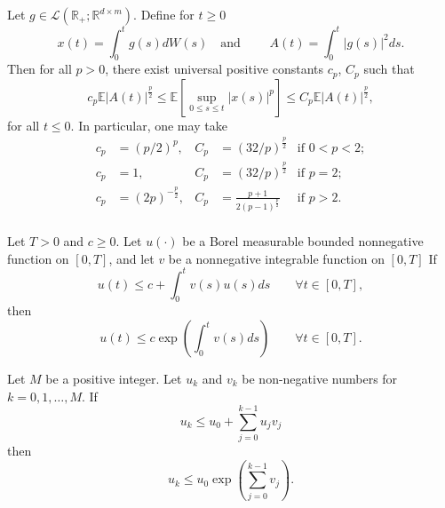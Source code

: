 \documentclass[3p]{elsarticle}
\theoremstyle{definition}
\theoremstyle{plain}%
\theoremstyle{remark}
\newcommand{\m}[1]{\mathbb{E}#1}
\begin{document}
\begin{appendices}
\begin{bdg}
	Let $g\in \mathcal{L}(\mathbb{R}_+; \mathbb{R}^{d\times m})$. Define for $t\geq 0$
	\begin{equation}
		\label{thm:BDG}
		x(t) = \int_{0}^{t} g(s)dW(s) \quad \text{and } \qquad 
		A(t) = \int_{0}^{t} |g(s)|^2 ds.
	\end{equation}
	Then for all $p>0$, there exist universal positive constants $c_p$, $C_p$ such that
	\begin{equation}
		c_p\m|{A(t)}|^{\frac{p}{2}}
		\leq
		\m \left[
		\sup_{0\leq s \leq t} |x(s)|^p
		\right]
		\leq 
		C_p \m |A(t)|^{\frac{p}{2}},
	\end{equation}
	for all $t\leq 0$.  In particular, one may take
	\begin{align*}
	c_p &= (p/2)^p, & 			 C_p &= (32/p)^{\frac{p}{2}} & \text{if } 0<p<2; \\
	c_p &= 1,       & 			 C_p &= (32/p)^{\frac{p}{2}} & \text{if } p=2; \\
	c_p &= (2p)^{-\frac{p}{2}},& C_p &= \frac{p+1}{2(p-1)^{\frac{p}{2}}} & \text{if } p>2 .\\
	\end{align*}
\end{bdg}

\begin{Gronwall}
	Let $T > 0$ and $c \geq 0$. Let $u(·)$ be a Borel measurable bounded nonnegative function on 
	$[0,T]$, and let $v$ be a nonnegative integrable function on $[0,T]$
	If
	$$
	u(t) \leq c 
	+\int_{0}^{t} v(s)u(s)ds \qquad \forall t \in [0,T],
	$$
	then
	\begin{equation}\label{thm:Gronwall}
		u(t) \leq c\exp
		\left(
		\int_{0}^{t} v(s)ds 
		\right)
		\qquad \forall t \in [0,T].
	\end{equation}
\end{Gronwall}
%
\begin{DiscreteGronwall}
	Let $M$ be a positive integer. Let $u_k$ and $v_k$ be non-negative numbers for $k=0,1,\dots,M$. 
	If
	$$
	u_k\leq u_0 + \sum_{j=0}^{k-1} u_j v_j
	$$
	then
	\begin{equation}
		\label{thm:DiscreteGronwall}
		u_k \leq u_0 
		\exp
		\left(
		\sum_{j=0}^{k-1}v_j
		\right).
	\end{equation}
\end{DiscreteGronwall}
\end{appendices}
\end{document}
